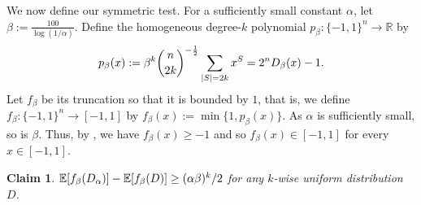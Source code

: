 \documentclass[10pt,a4paper]{article}
\newtheorem{claim}[theorem]{Claim}
\theoremstyle{definition}
\newcommand{\E}{\mathop{\mathbb{E}\/}}
\newcommand{\R}{\mathbb R}
\newcommand{\pmo}{\{-1,1\}}
\DeclarePairedDelimiter\abs{\lvert}{\rvert}
\begin{document}
We now define our symmetric test.
For a sufficiently small constant $\alpha$, let $\beta := \frac{100}{\log(1/\alpha)}$.
Define the homogeneous degree-$k$ polynomial $p_\beta \colon\pmo^n \to \R$ by
  \[
    p_\beta(x) := \beta^k \binom{n}{2k}^{-\frac{1}{2}} \sum_{\abs{S}=2k} x^S = 2^n D_\beta(x) - 1.
  \]
  Let $f_\beta$ be its truncation so that it is bounded by $1$, that is, we define $f_\beta\colon\pmo^n \to [-1,1]$ by $f_\beta(x) := \min\{1, p_\beta(x)\}$.
  As $\alpha$ is sufficiently small, so is $\beta$.
  Thus, by , we have $f_\beta(x) \ge -1$ and so $f_\beta(x) \in [-1,1]$ for every $x \in [-1,1]$.

  \begin{claim} \label{claim:OZ-distinguish}
    $\E[f_\beta(D_\alpha)] - \E[f_\beta(D)] \ge (\alpha \beta)^k/2$ for any $k$-wise uniform distribution $D$.
  \end{claim}
\end{document}
